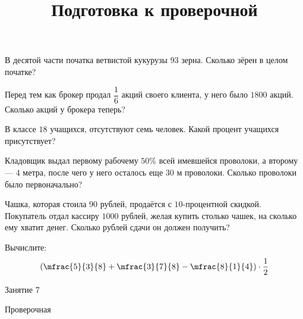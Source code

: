 \begin{homework}[number=3]
	\begin{listofex}
		\item В десятой части початка ветвистой кукурузы \(93\) зерна. Сколько зёрен в целом початке?
		\item Перед тем как брокер продал \( \dfrac{1}{6} \) акций своего клиента, у него было \(1800\) акций. Сколько акций у брокера теперь?
		\item В классе  \(18\)  учащихся, отсутствуют семь человек. Какой процент учащихся присутствует?
		\item Кладовщик выдал первому рабочему \(50 \% \) всей имевшейся проволоки, а второму --- \(4\) метра, после чего у него осталось еще \(30\) м проволоки. Сколько проволоки было первоначально?
		\item Чашка, которая стоила \(90\) рублей, продаётся с \(10\)-процентной скидкой. Покупатель отдал кассиру \(1000\) рублей, желая купить столько чашек, на сколько ему хватит денег. Сколько рублей сдачи он должен получить?
		\item Вычислите:
		\[ \left( \mfrac{5}{3}{8} + \mfrac{3}{7}{8} - \mfrac{8}{1}{4} \right) \cdot \dfrac{1}{2} \]
	\end{listofex}
\end{homework}

\begin{class}[number=7]
	\title{Подготовка к проверочной}
	\begin{listofex}
		\item Занятие 7
	\end{listofex}
\end{class}

\begin{exam}
	\begin{listofex}
		\item Проверочная
	\end{listofex}
\end{exam}

